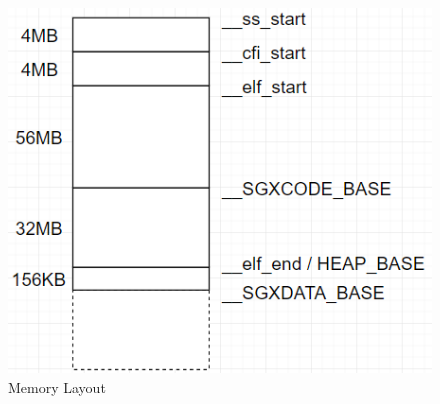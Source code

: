 \begin{figure}[htbp]
\centerline{\includegraphics[scale=0.42]{figures/memlayout.png}}
\caption{Memory Layout}\label{fg-memlayout}
\label{fig}
\end{figure}